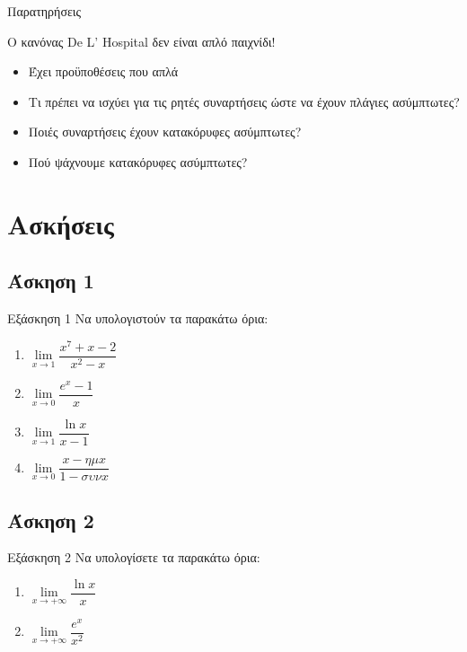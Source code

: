 \documentclass[greek]{beamer}
\begin{document}
\begin{frame}{Παρατηρήσεις}

    Ο κανόνας De L' Hospital δεν είναι απλό παιχνίδι!

    \begin{itemize}
        \item<1-> Έχει προϋποθέσεις που απλά
        \item<2-> Τι πρέπει να ισχύει για τις ρητές συναρτήσεις ώστε να έχουν πλάγιες ασύμπτωτες?
        \item<3-> Ποιές συναρτήσεις έχουν κατακόρυφες ασύμπτωτες?
        \item<4-> Πού ψάχνουμε κατακόρυφες ασύμπτωτες?
    \end{itemize}

\end{frame}

\section{Ασκήσεις}
\subsection{Άσκηση 1}
\begin{frame}[label=Άσκηση1,t]{Εξάσκηση 1}
    Να υπολογιστούν τα παρακάτω όρια:
    \begin{enumerate}
        \item<1-> $\lim\limits_{x \to 1}{ \dfrac{x^7+x-2}{x^2-x} }$
        \item<2-> $\lim\limits_{x \to 0}{ \dfrac{e^x-1}{x} }$
        \item<3-> $\lim\limits_{x \to 1}{ \dfrac{\ln x}{x-1} }$
        \item<4-> $\lim\limits_{x \to 0}{ \dfrac{x-ημx}{1-συνx} }$
    \end{enumerate}

\end{frame}

\subsection{Άσκηση 2}
\begin{frame}[label=Άσκηση2,t]{Εξάσκηση 2}
    Να υπολογίσετε τα παρακάτω όρια:
    \begin{enumerate}
        \item<1-> $\lim\limits_{x \to +\infty}{ \dfrac{\ln x}{x} }$
        \item<2-> $\lim\limits_{x \to +\infty}{ \dfrac{e^x}{x^2} }$
    \end{enumerate}

\end{frame}
\end{document}
